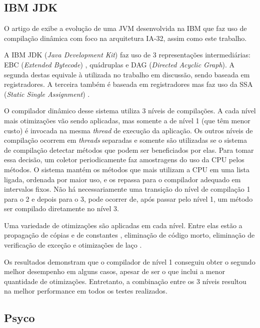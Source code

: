 \subsection{IBM JDK}

O artigo de  exibe a evolução
de uma JVM desenvolvida na IBM que faz uso de compilação dinâmica com
foco na arquitetura IA-32, assim como este trabalho.

A IBM JDK (\textit{Java Development Kit}) faz uso de 3 representações
intermediárias: EBC
(\textit{Extended Bytecode}) ,
quádruplas e DAG (\textit{Directed Acyclic Graph}).
A segunda destas equivale à utilizada no trabalho
em discussão, sendo baseada em registradores. A terceira também é
baseada em registradores mas faz uso da SSA (\textit{Static Single
  Assignment}) \cite{cytron}.

O compilador dinâmico desse sistema utiliza 3 níveis de compilações. A
cada nível mais otimizações vão sendo aplicadas, mas somente a de
nível 1 (que têm menor custo) é invocada na mesma \textit{thread} de
execução da aplicação. Os outros níveis de compilação ocorrem em
\textit{threads} separadas e somente são utilizadas se o sistema
de compilação detectar métodos que podem ser beneficiados por
elas. Para tomar essa decisão, um coletor periodicamente faz
amostragens do uso da CPU pelos métodos. O sistema mantém os métodos
que mais utilizam a CPU em uma lista ligada, ordenada por maior uso, e
os repassa para o compilador adequado em intervalos fixos. Não há
necessariamente uma transição do nível de compilação 1 para o 2 e
depois para o 3, pode ocorrer de, após passar pelo nível 1, um método
ser compilado diretamente no nível 3.

Uma variedade de otimizações são aplicadas em cada nível. Entre elas
estão a  propagação de cópias e de constantes \cite{optconstprog},
eliminação de código morto,
eliminação de verificação de exceção \cite{optelimverifcexec} e
otimizações de laço \cite{muchnick}.

Os resultados demonstram que o compilador de nível 1 conseguiu obter o
segundo melhor desempenho em alguns casos, apesar de ser o que inclui
a menor quantidade de otimizações. Entretanto, a combinação entre os 3
níveis resultou na melhor performance em todos os testes realizados.

\subsection{Psyco}

